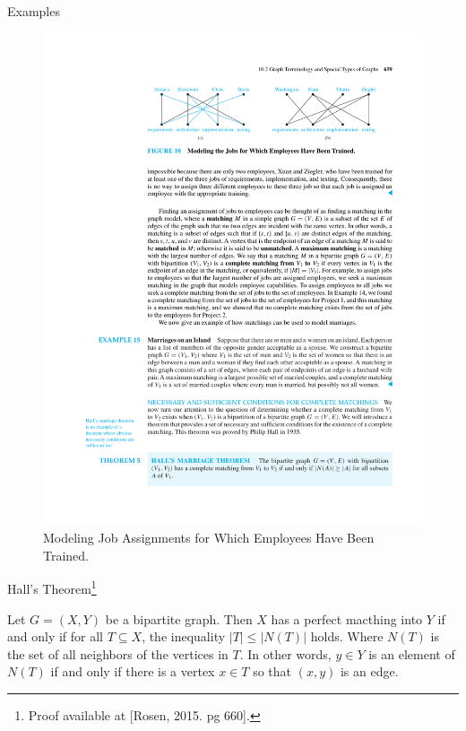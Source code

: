 \documentclass{beamer}
\theoremstyle{definition}
\begin{document}
\begin{frame}{Examples}
    \begin{figure}
        \includegraphics[trim={5.9cm 21.5cm 2.5cm 3cm}, clip, width=1\linewidth]{p659}
        \caption{Modeling Job Assignments for Which Employees Have Been Trained.}
    \end{figure}
\end{frame}

\begin{frame}{Hall's Theorem\footnote{Proof available at [Rosen, 2015. pg 660].}}
    \begin{theorem}
        Let $G = (X,Y)$ be a bipartite graph. Then $X$ has a perfect macthing into $Y$ if and only if for all $T \subseteq X$, the inequality $|T| \leq |N(T)|$ holds. Where $N(T)$ is the set of all neighbors of the vertices in $T$. In other words, $y \in  Y$ is an element of $N(T)$ if and only if there is a vertex $x \in  T$ so that $(x,y)$ is an edge.
    \end{theorem}
\end{frame}
\end{document}
